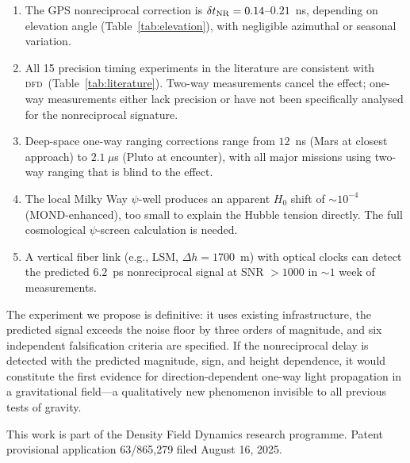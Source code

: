 \documentclass[aps,prl,twocolumn,superscriptaddress,showpacs]{revtex4-2}
\newcommand{\DFD}{\textsc{dfd}}
\begin{document}
\begin{enumerate}
\item The GPS nonreciprocal correction is $\delta t_{\rm NR}
      = 0.14$--$0.21$~ns, depending on elevation angle
      (Table~\ref{tab:elevation}), with negligible azimuthal
      or seasonal variation.

\item All 15 precision timing experiments in the literature
      are consistent with \DFD\ (Table~\ref{tab:literature}).
      Two-way measurements cancel the effect; one-way
      measurements either lack precision or have not been
      specifically analysed for the nonreciprocal signature.

\item Deep-space one-way ranging corrections range from
      $12$~ns (Mars at closest approach) to $2.1~\mu$s
      (Pluto at encounter), with all major missions using
      two-way ranging that is blind to the effect.

\item The local Milky Way $\psi$-well produces an apparent
      $H_0$ shift of $\sim 10^{-4}$ (MOND-enhanced), too
      small to explain the Hubble tension directly.  The full
      cosmological $\psi$-screen calculation is needed.

\item A vertical fiber link (e.g., LSM, $\Delta h = 1700$~m)
      with optical clocks can detect the predicted
      $6.2$~ps nonreciprocal signal at SNR $> 1000$ in
      $\sim 1$ week of measurements.
\end{enumerate}

The experiment we propose is definitive: it uses existing
infrastructure, the predicted signal exceeds the noise floor
by three orders of magnitude, and six independent falsification
criteria are specified.  If the nonreciprocal delay is detected
with the predicted magnitude, sign, and height dependence, it
would constitute the first evidence for direction-dependent
one-way light propagation in a gravitational field---a
qualitatively new phenomenon invisible to all previous tests
of gravity.

\begin{acknowledgments}
This work is part of the Density Field Dynamics research programme.
Patent provisional application 63/865,279 filed August 16, 2025.
\end{acknowledgments}
\end{document}
